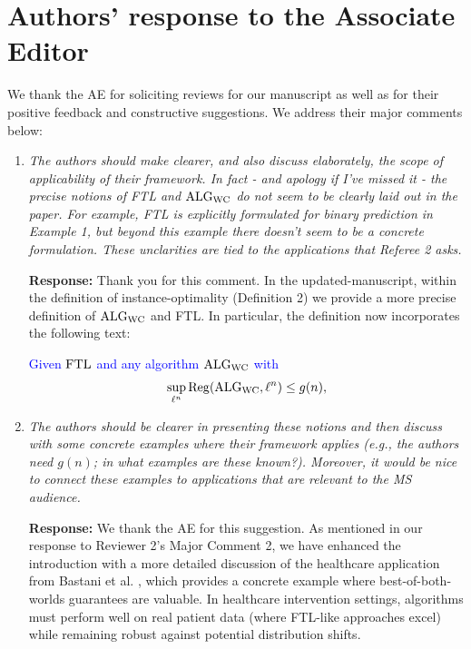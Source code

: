 \documentclass[11pt]{article}
\newcommand{\rev}{\textcolor{blue}}
\begin{document}
\newpage
\section*{Authors' response to the Associate Editor}
We thank the AE for soliciting reviews for our manuscript as well as for their positive feedback and constructive suggestions. We address their major comments below: 

\begin{enumerate}

    \item \emph{The authors should make clearer, and also discuss elaborately, the scope of applicability of their framework. In fact - and apology if I've missed it - the precise notions of FTL and $\text{ALG}_{\text{WC}}$ do not seem to be clearly laid out in the paper. For example, FTL is explicitly formulated for binary prediction in Example 1, but beyond this example there doesn't seem to be a concrete formulation. These unclarities are tied to the applications that Referee 2 asks.}
    

    {\bf Response:} Thank you for this comment. In the updated-manuscript, within the definition of instance-optimality (Definition 2) we provide a more precise definition of $\text{ALG}_{\text{WC}}$ and FTL. In particular, the definition now incorporates the following text:
    
    \rev{Given  $\text{FTL}$ 
and any algorithm $\text{ALG}_{\text{WC}}$ with 
\[
\sup_{\ell^n} \mathrm{Reg}(\text{ALG}_{\text{WC}}, \ell^n) \le g(n),
\] } \dotsc\dotsc

  \item \emph{The authors should be clearer in presenting these notions and then discuss with some concrete examples where their framework applies (e.g., the authors need $g(n)$; in what examples are these known?). Moreover, it would be nice to connect these examples to applications that are relevant to the MS audience.}

    {\bf Response:} We thank the AE for this suggestion. As mentioned in our response to Reviewer 2's Major Comment 2, we have enhanced the introduction with a more detailed discussion of the healthcare application from Bastani et al. \cite{bastani2021mostly}, which provides a concrete example where best-of-both-worlds guarantees are valuable. In healthcare intervention settings, algorithms must perform well on real patient data (where FTL-like approaches excel) while remaining robust against potential distribution shifts.
    

\end{enumerate}
\end{document}
